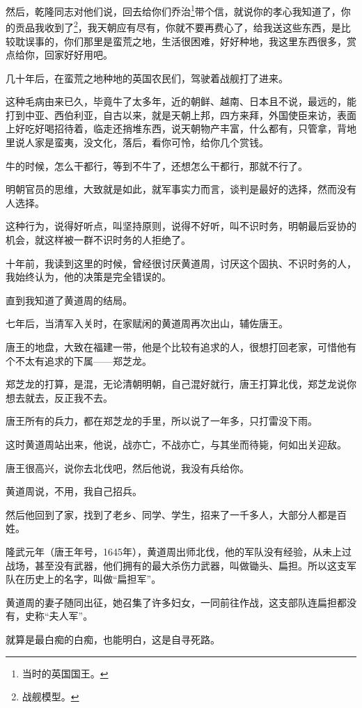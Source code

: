 \begin{multicols}{\theparacolNo}
然后，乾隆同志对他们说，回去给你们乔治\footnote{当时的英国国王。}带个信，就说你的孝心我知道了，你的贡品我收到了\footnote{战舰模型。}，我天朝应有尽有，你就不要再费心了，给我送这些东西，是比较耽误事的，你们那里是蛮荒之地，生活很困难，好好种地，我这里东西很多，赏点给你，回家好好用吧。

几十年后，在蛮荒之地种地的英国农民们，驾驶着战舰打了进来。

这种毛病由来已久，毕竟牛了太多年，近的朝鲜、越南、日本且不说，最远的，能打到中亚、西伯利亚，自古以来，就是天朝上邦，四方来拜，外国使臣来访，表面上好吃好喝招待着，临走还捎堆东西，说天朝物产丰富，什么都有，只管拿，背地里说人家是蛮夷，没文化，落后，看你可怜，给你几个赏钱。

牛的时候，怎么干都行，等到不牛了，还想怎么干都行，那就不行了。

明朝官员的思维，大致就是如此，就军事实力而言，谈判是最好的选择，然而没有人选择。

这种行为，说得好听点，叫坚持原则，说得不好听，叫不识时务，明朝最后妥协的机会，就这样被一群不识时务的人拒绝了。

十年前，我读到这里的时候，曾经很讨厌黄道周，讨厌这个固执、不识时务的人，我始终认为，他的决策是完全错误的。

直到我知道了黄道周的结局。

七年后，当清军入关时，在家赋闲的黄道周再次出山，辅佐唐王。

唐王的地盘，大致在福建一带，他是个比较有追求的人，很想打回老家，可惜他有个不太有追求的下属——郑芝龙。

郑芝龙的打算，是混，无论清朝明朝，自己混好就行，唐王打算北伐，郑芝龙说你想去就去，反正我不去。

唐王所有的兵力，都在郑芝龙的手里，所以说了一年多，只打雷没下雨。

这时黄道周站出来，他说，战亦亡，不战亦亡，与其坐而待毙，何如出关迎敌。

唐王很高兴，说你去北伐吧，然后他说，我没有兵给你。

黄道周说，不用，我自己招兵。

然后他回到了家，找到了老乡、同学、学生，招来了一千多人，大部分人都是百姓。

隆武元年（唐王年号，1645年），黄道周出师北伐，他的军队没有经验，从未上过战场，甚至没有武器，他们拥有的最大杀伤力武器，叫做锄头、扁担。所以这支军队在历史上的名字，叫做“扁担军”。

黄道周的妻子随同出征，她召集了许多妇女，一同前往作战，这支部队连扁担都没有，史称“夫人军”。

就算是最白痴的白痴，也能明白，这是自寻死路。


\end{multicols}
